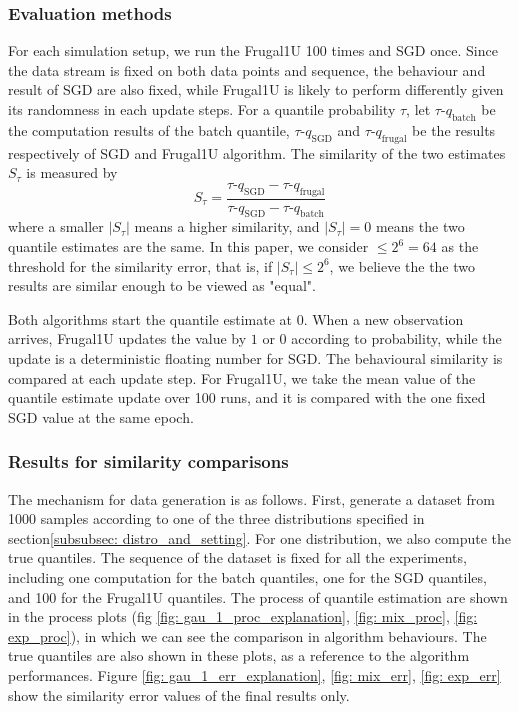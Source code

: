 \subsubsection{Evaluation methods}

For each simulation setup, we run the Frugal1U 100 times and SGD once. Since the data stream is fixed on both data points and sequence, the behaviour and result of SGD are also fixed, while Frugal1U is likely to perform differently given its randomness in each update steps. For a quantile probability $\tau$, let $\tau$-$q_{\text{batch}}$ be the computation results of the batch quantile, $\tau$-$q_{\text{SGD}}$ and $\tau$-$q_{\text{frugal}}$ be the results respectively of SGD and Frugal1U algorithm. The similarity of the two estimates $S_\tau$ is measured by
\begin{equation}
    S_\tau = \frac{ \tau\text{-}q_{\text{SGD}} - \tau\text{-}q_{\text{frugal}} }{ \tau\text{-}q_{\text{SGD}} - \tau\text{-}q_{\text{batch}} }
    \label{eq: frugal_err}
\end{equation}
where a smaller $|S_\tau|$ means a higher similarity, and $|S_\tau| = 0$ means the two quantile estimates are the same. In this paper, we consider $\leq 2^6 = 64$ as the threshold for the similarity error, that is, if $|S_\tau| \leq 2^6$, we believe the the two results are similar enough to be viewed as "equal".

Both algorithms start the quantile estimate at $0$. When a new observation arrives, Frugal1U updates the value by $1$ or $0$ according to probability, while the update is a deterministic floating number for SGD. The behavioural similarity is compared at each update step. For Frugal1U, we take the mean value of the quantile estimate update over 100 runs, and it is compared with the one fixed SGD value at the same epoch. 

\subsubsection{Results for similarity comparisons}

The mechanism for data generation is as follows. First, generate a dataset from 1000 samples according to one of the three distributions specified in section\ref{subsubsec: distro_and_setting}. For one distribution, we also compute the true quantiles. The sequence of the dataset is fixed for all the experiments, including one computation for the batch quantiles, one for the SGD quantiles, and 100 for the Frugal1U quantiles. The process of quantile estimation are shown in the process plots (fig \ref{fig: gau_1_proc_explanation}, \ref{fig: mix_proc}, \ref{fig: exp_proc}), in which we can see the comparison in algorithm behaviours. The true quantiles are also shown in these plots, as a reference to the algorithm performances.
Figure \ref{fig: gau_1_err_explanation}, \ref{fig: mix_err}, \ref{fig: exp_err} show the similarity error values of the final results only.

